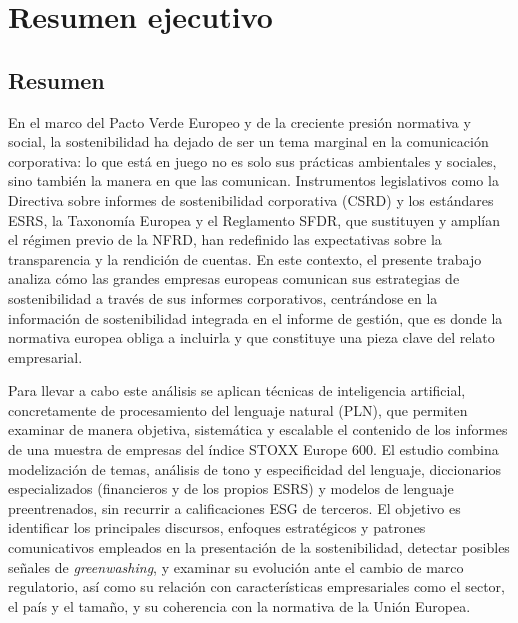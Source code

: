 \chapter*{Resumen ejecutivo}

\section*{Resumen}

En el marco del Pacto Verde Europeo y de la creciente presión normativa y social, la
sostenibilidad ha dejado de ser un tema marginal en la comunicación corporativa: lo que está en
juego no es solo sus prácticas ambientales y sociales, sino también la manera en que las
comunican. Instrumentos legislativos como la Directiva sobre informes de sostenibilidad
corporativa (CSRD) y los estándares ESRS, la Taxonomía Europea y el Reglamento SFDR, que
sustituyen y amplían el régimen previo de la NFRD, han redefinido las expectativas sobre la
transparencia y la rendición de cuentas. En este contexto, el presente trabajo analiza cómo las
grandes empresas europeas comunican sus estrategias de sostenibilidad a través de sus informes
corporativos, centrándose en la información de sostenibilidad integrada en el informe de
gestión, que es donde la normativa europea obliga a incluirla y que constituye una pieza clave
del relato empresarial.

Para llevar a cabo este análisis se aplican técnicas de inteligencia artificial, concretamente
de procesamiento del lenguaje natural (PLN), que permiten examinar de manera objetiva,
sistemática y escalable el contenido de los informes de una muestra de empresas del índice
STOXX Europe 600. El estudio combina modelización de temas, análisis de tono y especificidad
del lenguaje, diccionarios especializados (financieros y de los propios ESRS) y modelos de
lenguaje preentrenados, sin recurrir a calificaciones ESG de terceros. El objetivo es identificar
los principales discursos, enfoques estratégicos y patrones comunicativos empleados en la
presentación de la sostenibilidad, detectar posibles señales de \textit{greenwashing}, y examinar
su evolución ante el cambio de marco regulatorio, así como su relación con características
empresariales como el sector, el país y el tamaño, y su coherencia con la normativa de la Unión
Europea.

